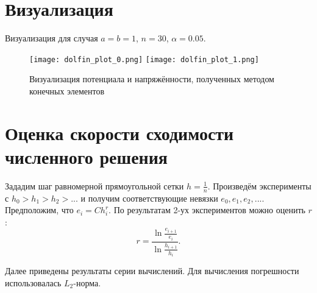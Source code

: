 \section{Визуализация}
Визуализация для случая $a=b=1$, $n=30$, $\alpha = 0.05$.
\begin{figure}[t]
	\texttt{[image: dolfin\_plot\_0.png]}
	\texttt{[image: dolfin\_plot\_1.png]}
	\caption{Визуализация потенциала и напряжённости, полученных методом конечных элементов}
	\centering
\end{figure}

\section{Оценка скорости сходимости численного решения}
Зададим шаг равномерной прямоугольной сетки $h=\frac{1}{n}$. Произведём эксперименты с $h_0>h_1>h_2>...$ и получим соответствующие невязки $e_0, e_1, e_2, ...$. Предположим, что $e_i=Ch_i^r$. По результатам 2-ух экспериментов можно оценить $r$:
\begin{equation}
	r = \frac{\ln{\frac{e_{i+1}}{e_i}}}{\ln{\frac{h_{i+1}}{h_i}}}.
\end{equation}

Далее приведены результаты серии вычислений. Для вычисления погрешности использовалась $L_2$-норма.
